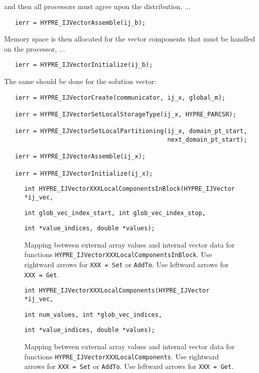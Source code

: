 \noindent and then all processors must agree upon the distribution, ...

\begin{verbatim}
   ierr = HYPRE_IJVectorAssemble(ij_b);
\end{verbatim}

\noindent Memory space is then allocated for the vector components
that must be handled on the processor, ...

\begin{verbatim}
   ierr = HYPRE_IJVectorInitialize(ij_b);          
\end{verbatim}

\noindent The same should be done for the solution vector:

\begin{verbatim}
   ierr = HYPRE_IJVectorCreate(communicator, ij_x, global_m);

   ierr = HYPRE_IJVectorSetLocalStorageType(ij_x, HYPRE_PARCSR);

   ierr = HYPRE_IJVectorSetLocalPartitioning(ij_x, domain_pt_start,
                                             next_domain_pt_start);

   ierr = HYPRE_IJVectorAssemble(ij_x);

   ierr = HYPRE_IJVectorInitialize(ij_x);
\end{verbatim}

\begin{figure}
\label{loc_comps_blk}
\centerline{}
\vspace{0.15in}
\parbox{6.5in}{\hspace{1in}
  {\tt int HYPRE\_IJVectorXXXLocalComponentsInBlock(HYPRE\_IJVector *ij\_vec,}}
\parbox{6.5in}{\hspace{2in}
  {\tt int glob\_vec\_index\_start, int glob\_vec\_index\_stop,}}
\parbox{6.5in}{\hspace{2in}
  {\tt int *value\_indices, double *values);}}
\caption{Mapping between external array values and
  internal vector data for functions
  {\tt HYPRE\_IJVectorXXX}{\tt LocalComponentsInBlock}.
  Use rightward arrows for {\tt XXX = Set} or {\tt AddTo}.
  Use leftward arrows for {\tt XXX = Get}.}
\end{figure}

\begin{figure}
\label{loc_comps}
\centerline{}
\vspace{0.15in}
\parbox{6.5in}{\hspace{1in}
   {\tt int HYPRE\_IJVectorXXXLocalComponents(HYPRE\_IJVector *ij\_vec,}}
\parbox{6.5in}{\hspace{2in}
   {\tt int num\_values, int *glob\_vec\_indices,}}
\parbox{6.5in}{\hspace{2in}
   {\tt int *value\_indices, double *values);}}
\caption{Mapping between external array values and
   internal vector data for functions
   {\tt HYPRE\_IJVectorXXX}{\tt LocalComponents}.
   Use rightward arrows for {\tt XXX = Set} or {\tt AddTo}.
   Use leftward arrows for {\tt XXX = Get}.}
\end{figure}


